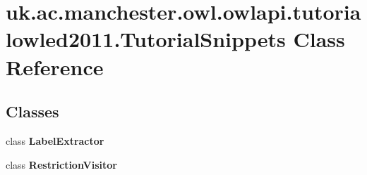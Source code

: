 \hypertarget{classuk_1_1ac_1_1manchester_1_1owl_1_1owlapi_1_1tutorialowled2011_1_1_tutorial_snippets}{\section{uk.\-ac.\-manchester.\-owl.\-owlapi.\-tutorialowled2011.\-Tutorial\-Snippets Class Reference}
\label{classuk_1_1ac_1_1manchester_1_1owl_1_1owlapi_1_1tutorialowled2011_1_1_tutorial_snippets}
}
\subsection*{Classes}
\begin{DoxyCompactItemize}
\item 
class {\bfseries Label\-Extractor}
\item 
class {\bfseries Restriction\-Visitor}
\end{DoxyCompactItemize}
